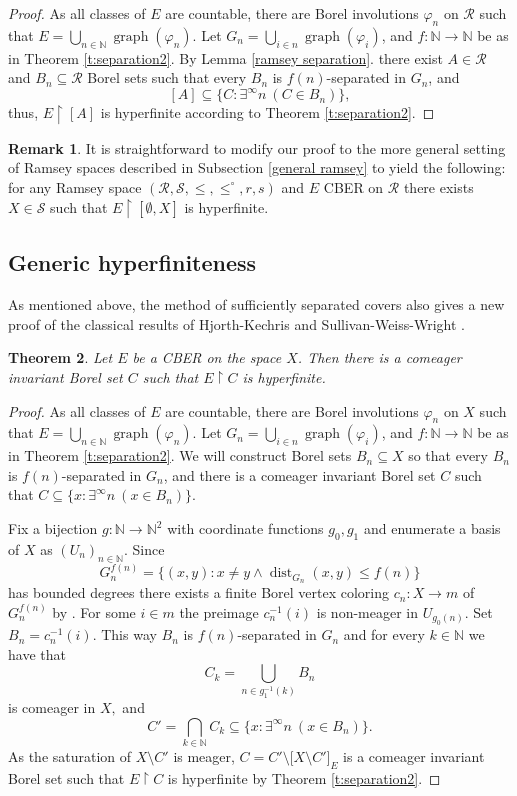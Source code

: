 \documentclass[11pt]{amsart}
\newcommand{\N}{\mathbb{N}}
\renewcommand{\restriction}[2]{#1 \upharpoonright #2}
\newtheorem{theorem}{Theorem}[section]
\theoremstyle{definition}
\newtheorem{remark}[theorem]{Remark}
\numberwithin{equation}{section}
\DeclareMathOperator{\graph}{graph}
\DeclareMathOperator{\dist}{dist}
\newcommand{\rstr}{\restriction}
\newcommand{\vfi}{\varphi}
\newcommand{\sse}{\subseteq}
\newcommand{\est}{\emptyset}
\newcommand{\fR}{\mathcal{R}}
\begin{document}
	\begin{proof}
		As all classes of $E$ are countable, there are Borel involutions $\vfi_n$ on $\fR$ such that $E=\bigcup_{n\in\N}\graph(\vfi_n)$. Let $G_n=\bigcup_{i\in n}\graph(\vfi_i)$, and $f:\N\to \N$ be as in Theorem \ref{t:separation2}. By Lemma \ref{ramsey separation}. there exist $A\in\fR$ and $B_n\sse\fR$ Borel sets such that every $B_n$ is $f(n)$-separated in $G_n$, and 
		$$[A]\sse\{C:\exists^\infty n \ (C \in B_n)\},$$
		thus, $\rstr{E}{[A]}$ is hyperfinite according to Theorem \ref{t:separation2}.
	\end{proof}

	\begin{remark}
	    It is straightforward to modify our proof to the more general setting of Ramsey spaces described in Subsection \ref{general ramsey} to yield the following: for any Ramsey space $(\mathcal{R}, \mathcal{S}, \le,\le^\circ, r, s)$ and $E$ CBER on $\mathcal{R}$ there exists $X\in\mathcal{S}$ such that $\rstr{E}{[\est,X]}$ is hyperfinite.
	\end{remark}
	
	\subsection{Generic hyperfiniteness}
	\label{s:generic}
	
	As mentioned above, the method of sufficiently separated covers also gives a new proof of the classical results of Hjorth-Kechris \cite{hjorth-kechris1996} and Sullivan-Weiss-Wright \cite{sullivan1986generic}.
	
	\begin{theorem}
		Let $E$ be a CBER on the space $X$. Then there is a comeager invariant Borel set $C$ such that $\rstr{E}{C}$ is hyperfinite.
	\end{theorem}
	
	\begin{proof}
		As all classes of $E$ are countable, there are Borel involutions $\vfi_n$ on $X$ such that $E=\bigcup_{n\in\N}\graph(\vfi_n)$. Let $G_n=\bigcup_{i\in n}\graph(\vfi_i)$, and $f:\N\to \N$ be as in Theorem \ref{t:separation2}. We will construct Borel sets $B_n \subseteq X$ so that every $B_n$ is $f(n)$-separated in $G_n$, and there is a comeager invariant Borel set $C$ such that $C\sse\{x:\exists^\infty n \ (x \in B_n)\}$. 
		
		Fix a bijection $g:\N\to\N^2$ with coordinate functions $g_0,g_1$ and enumerate a basis of $X$ as $(U_n)_{n\in\N}.$ Since \[G_n^{f(n)}=\{(x,y):x\neq y \wedge \dist_{G_n}(x,y)\le f(n) \}\]  has bounded degrees there exists a finite Borel vertex coloring $c_n:X\to m$ of $G_n^{f(n)}$ by \cite{KST}. For some $i\in m$ the preimage $c_n^{-1}(i)$ is non-meager in $U_{g_0(n)}.$ Set $B_n=c_n^{-1}(i).$ This way $B_n$ is $f(n)$-separated in $G_n$ and for every $k\in\N$ we have that
		\[C_k=\bigcup_{n\in g_1^{-1}(k)}B_n\]
		is comeager in $X,$ and 
		\[C'=\bigcap_{k\in\N}C_k\sse \{x:\exists^\infty n \ (x \in B_n)\}.\]
		As the saturation of $X\setminus C'$ is meager, $C =C'\setminus\big[X\setminus C'\big]_E$ is a comeager invariant Borel set such that $\rstr{E}{C}$ is hyperfinite by Theorem \ref{t:separation2}.
	\end{proof}
    
\end{document}
